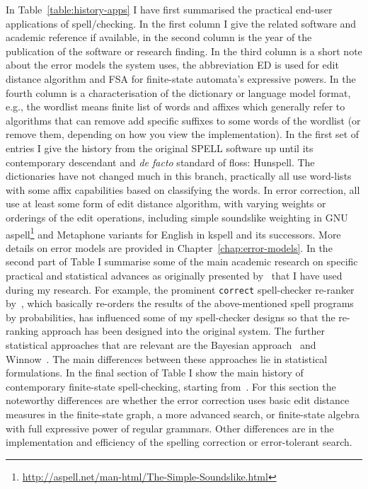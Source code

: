 \documentclass[officiallayout,final]{unihelcompling}
\begin{document}
In Table~\ref{table:history-apps} I have first summarised the practical
end-user applications of spell\-/checking. In the first column I give the
related software and academic reference if available, in the second column is
the year of the publication of the software or research finding. In the third
column is a short note about the error models the system uses, the abbreviation
ED is used for edit distance algorithm and FSA for finite-state automata's
expressive powers. In the fourth column is a characterisation of the dictionary
or language model format, e.g., the wordlist means finite list of words and
affixes which generally refer to algorithms that can remove add specific
suffixes to some words of the wordlist (or remove them, depending on how you
view the implementation).  In the first set of entries I give the history from
the original SPELL software up until its contemporary descendant and \emph{de
facto} standard of \gls{floss}: Hunspell. The dictionaries have not changed
much in this branch, practically all use word-lists with some affix
capabilities based on classifying the words. In error correction, all use at
least some form of edit distance algorithm, with varying weights or orderings
of the edit operations, including simple soundslike weighting in GNU
aspell\footnote{\url{http://aspell.net/man-html/The-Simple-Soundslike.html}}
and Metaphone variants for English in kspell and its successors. More details
on error models are provided in  Chapter~\ref{chap:error-models}.  In the
second part of Table I summarise some of the main academic research on specific
practical and statistical advances as originally presented
by~\citet{al2006learning} that I have used during my research. For example, the
prominent \texttt{correct} spell-checker re-ranker
by~\citet{church1991probability}, which basically re-orders the results of the
above-mentioned spell programs by probabilities, has influenced some of my
spell-checker designs so that the re-ranking approach has been designed into
the original system.  The further statistical approaches that are relevant are
the Bayesian approach~\citep{golding1995bayesian} and
Winnow~\citep{golding1999winnow}. The main differences between these approaches
lie in statistical formulations.  In the final section of Table I show the main
history of contemporary finite-state spell-checking, starting
from~\citet{oflazer1996errortolerant}.  For this section the noteworthy
differences are whether the error correction uses basic edit distance measures
in the finite-state graph, a more advanced search, or finite-state algebra with
full expressive power of regular grammars.  Other differences are in the
implementation and efficiency of the spelling correction or error-tolerant
search.
\end{document}
